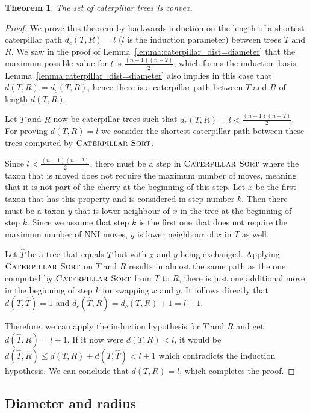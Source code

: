 \documentclass{amsart}
\newcommand{\nni}{\mathrm{NNI}}
\newcommand{\csort}{\textsc{Caterpillar Sort}}
\newtheorem{theorem}[definition]{Theorem}
\begin{document}
\begin{theorem}
The set of caterpillar trees is convex.
\label{thm:caterpillar_convex}
\end{theorem}

\begin{proof}
We prove this theorem by backwards induction on the length of a shortest caterpillar path $d_c(T,R) = l$ ($l$ is the induction parameter) between trees $T$ and $R$.
We saw in the proof of Lemma~\ref{lemma:caterpillar_dist=diameter} that the maximum possible value for $l$ is $\frac{(n-1)(n-2)}{2}$, which forms the induction basis.
Lemma~\ref{lemma:caterpillar_dist=diameter} also implies in this case that $d(T, R) = d_c(T, R)$, hence there is a caterpillar path between $T$ and $R$ of length $d(T, R)$.

Let $T$ and $R$ now be caterpillar trees such that $d_c(T, R) = l < \frac{(n-1)(n-2)}{2}$.
For proving $d(T,R) = l$ we consider the shortest caterpillar path between these trees computed by $\csort$.

Since $l < \frac{(n-1)(n-2)}{2}$, there must be a step in $\csort$ where the taxon that is moved does not require the maximum number of moves, meaning that it is not part of the cherry at the beginning of this step.
Let $x$ be the first taxon that has this property and is considered in step number $k$.
Then there must be a taxon $y$ that is lower neighbour of $x$ in the tree at the beginning of step $k$.
Since we assume that step $k$ is the first one that does not require the maximum number of $\nni$ moves, $y$ is lower neighbour of $x$ in $T$ as well.

Let $\hat T$ be a tree that equals $T$ but with $x$ and $y$ being exchanged.
Applying $\csort$ on $\hat T$ and $R$ results in almost the same path as the one computed by $\csort$ from $T$ to $R$, there is just one additional move in the beginning of step $k$ for swapping $x$ and $y$.
It follows directly that $d(T, \hat T) = 1$ and $d_c(\hat T,R) = d_c(T,R) + 1 = l + 1$.

Therefore, we can apply the induction hypothesis for $\hat T$ and $R$ and get $d(\hat T,R) = l+1$.
If it now were $d(T,R) < l$, it would be $d(\hat T,R) \leq d(T,R) + d(T,\hat T) < l + 1$ which contradicts the induction hypothesis.
We can conclude that $d(T,R) = l$, which completes the proof.
\end{proof}


\subsection{Diameter and radius}
\label{section:diameter}
\end{document}
